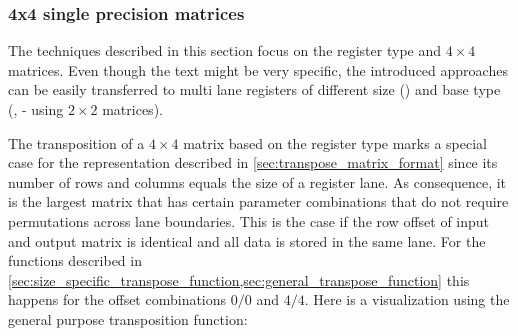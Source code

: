 \subsubsection{4x4 single precision matrices}
\label{sec:Implementation_4x4_matrices}

The techniques described in this section focus on the  register type and $4 \times 4$ matrices.
Even though the text might be very specific, the introduced approaches can be easily transferred to multi lane registers of different size () and base type (,  - using $2 \times 2$ matrices).

The transposition of a $4 \times 4$ matrix based on the  register type marks a special case for the representation described in \cref{sec:transpose_matrix_format} since its number of rows and columns equals the size of a register lane.
As consequence, it is the largest matrix that has certain parameter combinations that do not require permutations across lane boundaries.
This is the case if the row offset of input and output matrix is identical and all data is stored in the same lane.
For the functions described in \cref{sec:size_specific_transpose_function,sec:general_transpose_function} this happens for the offset combinations $0/0$ and $4/4$.
Here is a visualization using the general purpose transposition function:

